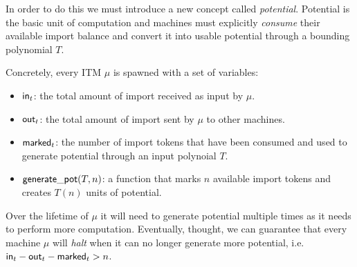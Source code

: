 In order to do this we must introduce a new concept called \textit{potential}. 
Potential is the basic unit of computation and machines must explicitly \textit{consume} their available import balance and convert it into usable potential through a bounding polynomial $T$.

Concretely, every ITM $\mu$ is spawned with a set of variables:
\begin{itemize}
\item ${\mathsf {in}}_t$: the total amount of import received as input by $\mu$.
\item ${\mathsf {out}}_t$: the total amount of import sent by $\mu$ to other machines.
\item ${\mathsf {marked}}_t$: the number of import tokens that have been consumed and used to generate potential through an input polynoial $T$.
\item ${\mathsf {generate\_pot}}(T, n)$: a function that marks $n$ available import tokens and creates $T(n)$ units of potential.
\end{itemize}

Over the lifetime of $\mu$ it will need to generate potential multiple times as it needs to perform more computation.
Eventually, thought, we can guarantee that every machine $\mu$ will \textit{halt} when it can no longer generate more potential, i.e.  ${\mathsf {in}}_t - {\mathsf {out}}_t - {\mathsf {marked}}_t > n$.

